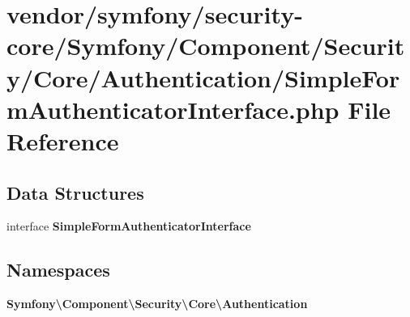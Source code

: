\section{vendor/symfony/security-\/core/\+Symfony/\+Component/\+Security/\+Core/\+Authentication/\+Simple\+Form\+Authenticator\+Interface.php File Reference}
\label{_simple_form_authenticator_interface_8php}
\subsection*{Data Structures}
\begin{DoxyCompactItemize}
\item 
interface {\bf Simple\+Form\+Authenticator\+Interface}
\end{DoxyCompactItemize}
\subsection*{Namespaces}
\begin{DoxyCompactItemize}
\item 
 {\bf Symfony\textbackslash{}\+Component\textbackslash{}\+Security\textbackslash{}\+Core\textbackslash{}\+Authentication}
\end{DoxyCompactItemize}
